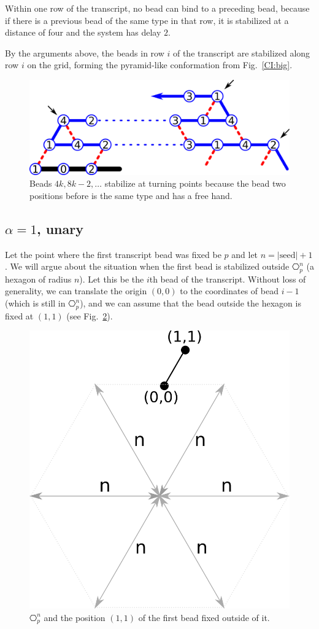 Within one row of the transcript, no bead can bind to a preceding bead, because if there is a previous bead of the same type in that row, it is stabilized at a distance of four and the system has delay $2$.

By the arguments above, the beads in row $i$ of the transcript are stabilized along row $i$ on the grid, forming the pyramid-like conformation from Fig.~\ref{CI:big}.


\begin{figure}
	\centering
	\includegraphics[width=0.7\linewidth]{./Fig/CI_turnn}
	\caption{Beads $4k, 8k-2, \dots$ stabilize at turning points because the bead two positions before is the same type and has a free hand.}
	\label{CI:turn}
\end{figure}




\subsection{$\alpha = 1$, unary}
\label{sec:unary}

Let the point where the first transcript bead was fixed be $p$ and let $n=|\mathrm{seed}|+1$. We will argue about the situation when the first bead is stabilized outside $\hexagon_p^n$ (a hexagon of radius $n$). Let this be the $i$th bead of the transcript. Without loss of generality, we can translate the origin $(0,0)$ to the coordinates of bead $i-1$ (which is still in $\hexagon_p^n$), and we can assume that the bead outside the hexagon is fixed at $(1,1)$ (see Fig.~\ref{fig:hexagonOut}).
\begin{figure}
	\centering
	\includegraphics[width=0.3\linewidth]{./Fig/hexagonOut}
	\caption{$\hexagon_p^n$ and the position $(1,1)$ of the first bead fixed outside of it.}
	\label{fig:hexagonOut}
\end{figure}

